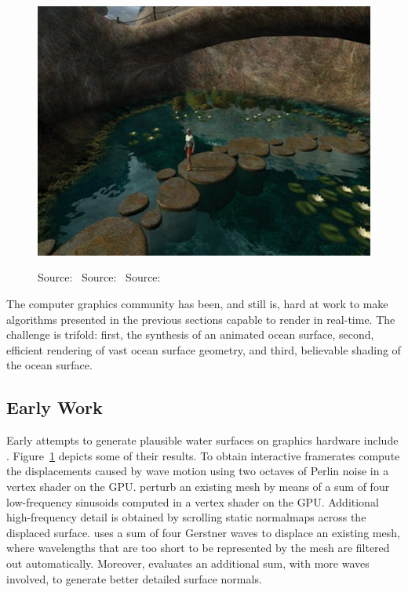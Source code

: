 \begin{figure}
{  \includegraphics[scale=0.175]{figures/Effective_Water_Simulation_from_Physical_Models_-_Finch_2004-003.png}
	\label{fig:finch}
 }
 \caption{
 Source:~\cite{Schneider:2001}
 Source:~\cite{Isidoro:2002}
 Source:~\cite{Finch:2004}
}
\label{fig:earlygpu}
\end{figure}
%
The computer graphics community has been, and still is, hard at work to make
algorithms presented in the previous sections capable to render in real-time.
The challenge is trifold: first, the synthesis of an animated ocean surface,
second, efficient rendering of vast ocean surface geometry, and third,
believable shading of the ocean surface.

\subsection{Early Work}
Early attempts to generate plausible water surfaces on graphics hardware include
\cite{Schneider:2001, Isidoro:2002, Finch:2004}. Figure~\ref{fig:earlygpu}
depicts some of their results.
To obtain interactive framerates \citeauthor{Schneider:2001} compute the
displacements caused by wave motion using two octaves of Perlin noise in a
vertex shader on the GPU.
\citeauthor{Isidoro:2002} perturb an existing mesh by means of a sum of four
low-frequency sinusoids computed in a vertex shader on the GPU. Additional
high-frequency detail is obtained by scrolling static normalmaps across the
displaced surface.
\citeauthor{Finch:2004} uses a sum of four Gerstner waves to displace an existing
mesh, where wavelengths that are too short to be represented by the mesh are
filtered out automatically. Moreover, \citeauthor{Finch:2004} evaluates an
additional sum, with more waves involved, to generate better detailed surface
normals.

